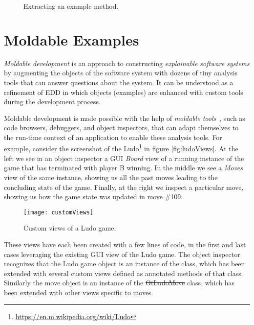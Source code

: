 \documentclass[sigplan,anonymous,review,10pt]{acmart}
\begin{document}
\begin{figure}[ht]
\centering
{}\qquad
{}\qquad
{}\qquad
{}\qquad
  \caption{Extracting an example method.}
  \label{fig:exampleExtraction}
\end{figure}


\section{Moldable Examples}\label{sec:moldable}

\emph{Moldable development} is an approach to constructing \emph{explainable software systems} by augmenting the objects of the software system with dozens of tiny analysis tools that can answer questions about the system.
It can be understood as a refinement of EDD in which objects (examples) are enhanced with custom tools during the development process.

Moldable development is made possible with the help of \emph{moldable tools}~\cite{Chis17a}, such as code browsers, debuggers, and object inspectors, that can adapt themselves to the run-time context of an application to enable these analysis tools.
For example, consider the screenshot of the Ludo\footnote{\url{https://en.m.wikipedia.org/wiki/Ludo}} in figure \autoref{fig:ludoViews}.
At the left we see in an object inspector a GUI \emph{Board} view of a running instance of the game that has terminated with player B winning.
In the middle we see a \emph{Moves} view of the same instance, showing us all the past moves leading to the concluding state of the game.
Finally, at the right we inspect a particular move, showing us how the game state was updated in move \#109.

\begin{figure}[h]
  \texttt{[image: customViews]}
  \caption{Custom views of a Ludo game.}
  \label{fig:ludoViews}
\end{figure}

These views have each been created with a few lines of code, in the first and last cases leveraging the existing GUI view of the Ludo game.
The object inspector recognizes that the Ludo game object is an instance of the  class, 
which has been extended with several custom views defined as annotated methods of that class.
Similarly the move object is an instance of the \st{GtLudoMove} class, which has been extended with other views specific to moves.
\end{document}
